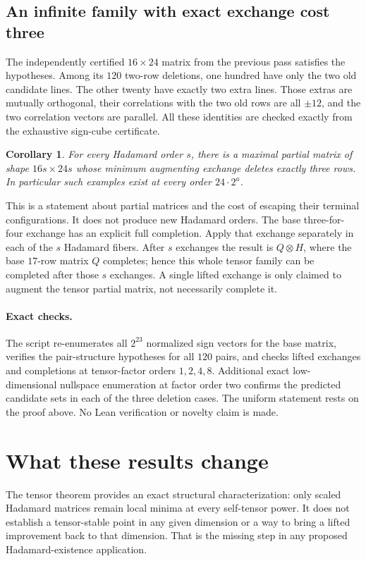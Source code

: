 \documentclass[11pt]{article}
\newtheorem{corollary}[theorem]{Corollary}
\begin{document}
\subsection{An infinite family with exact exchange cost three}
The independently certified $16\times24$ matrix from the previous pass
satisfies the hypotheses. Among its $120$ two-row deletions, one hundred
have only the two old candidate lines. The other twenty have exactly
two extra lines. Those extras are mutually orthogonal, their
correlations with the two old rows are all $\pm12$, and the two
correlation vectors are parallel. All these identities are checked
exactly from the exhaustive sign-cube certificate.

\begin{corollary}
For every Hadamard order $s$, there is a maximal partial matrix of
shape $16s\times24s$ whose minimum augmenting exchange deletes exactly
three rows. In particular such examples exist at every order
$24\cdot2^a$.
\end{corollary}

This is a statement about partial matrices and the cost of escaping
their terminal configurations. It does not produce new Hadamard orders.
The base three-for-four exchange has an explicit full completion. Apply
that exchange separately in each of the $s$ Hadamard fibers. After
$s$ exchanges the result is $Q\otimes H$, where the base $17$-row
matrix $Q$ completes; hence this whole tensor family can be completed
after those $s$ exchanges. A single lifted exchange is only claimed
to augment the tensor partial matrix, not necessarily complete it.

\paragraph{Exact checks.}
The script  re-enumerates all $2^{23}$
normalized sign vectors for the base matrix, verifies the pair-structure
hypotheses for all $120$ pairs, and checks lifted exchanges and
completions at tensor-factor orders $1,2,4,8$. Additional exact
low-dimensional nullspace enumeration at factor order two confirms
the predicted candidate sets in each of the three deletion cases.
The uniform statement rests on the proof above. No Lean verification
or novelty claim is made.

\section{What these results change}
The tensor theorem provides an exact structural characterization:
only scaled Hadamard matrices remain local minima at every self-tensor
power. It does not establish a tensor-stable point in any given
dimension or a way to bring a lifted improvement back to that dimension.
That is the missing step in any proposed Hadamard-existence application.
\end{document}
